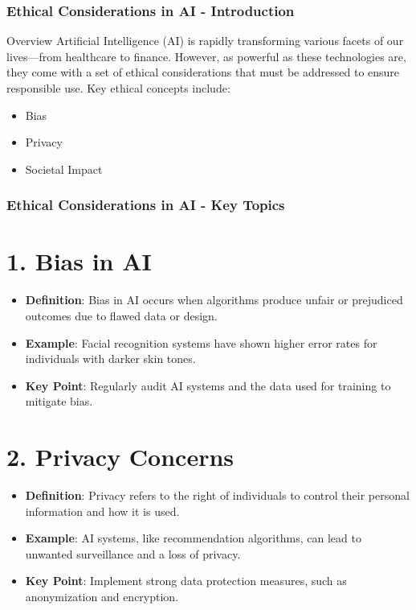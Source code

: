 \documentclass[aspectratio=169]{beamer}
\begin{document}
\begin{frame}[fragile]
    \frametitle{Ethical Considerations in AI - Introduction}
    \begin{block}{Overview}
        Artificial Intelligence (AI) is rapidly transforming various facets of our lives—from healthcare to finance. 
        However, as powerful as these technologies are, they come with a set of ethical considerations that must be addressed to ensure responsible use. 
        Key ethical concepts include:
    \end{block}
    \begin{itemize}
        \item Bias
        \item Privacy
        \item Societal Impact
    \end{itemize}
\end{frame}

\begin{frame}[fragile]
    \frametitle{Ethical Considerations in AI - Key Topics}
    \section*{1. Bias in AI}
    \begin{itemize}
        \item \textbf{Definition}: Bias in AI occurs when algorithms produce unfair or prejudiced outcomes due to flawed data or design.
        \item \textbf{Example}: Facial recognition systems have shown higher error rates for individuals with darker skin tones.
        \item \textbf{Key Point}: Regularly audit AI systems and the data used for training to mitigate bias.
    \end{itemize}

    \section*{2. Privacy Concerns}
    \begin{itemize}
        \item \textbf{Definition}: Privacy refers to the right of individuals to control their personal information and how it is used.
        \item \textbf{Example}: AI systems, like recommendation algorithms, can lead to unwanted surveillance and a loss of privacy.
        \item \textbf{Key Point}: Implement strong data protection measures, such as anonymization and encryption.
    \end{itemize}
\end{frame}
\end{document}
